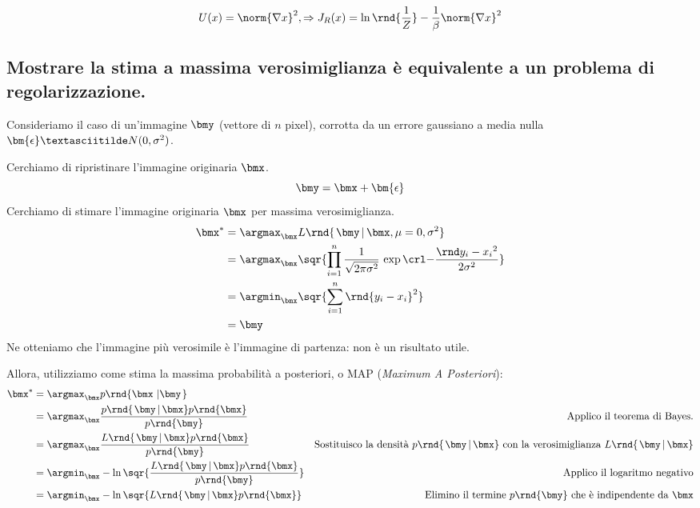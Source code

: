 \documentclass[\main/main.tex]{subfiles}
\begin{document}
\[
	U(x)=\norm{\nabla x}^2, \Rightarrow J_R(x) = \ln\rnd{\frac{1}{Z}}-\frac{1}{\beta}\norm{\nabla x}^2
\]

\subsection{Mostrare la stima a massima verosimiglianza è equivalente a un problema di regolarizzazione.}

Consideriamo il caso di un'immagine $\bmy$ (vettore di $n$ pixel), corrotta da un errore gaussiano a media nulla $\bm{\epsilon} \textasciitilde N(0,\sigma^2)$.

Cerchiamo di ripristinare l'immagine originaria $\bmx$.
\[
	\bmy=\bmx+\bm{\epsilon}
\]
Cerchiamo di stimare l'immagine originaria $\bmx$ per massima verosimiglianza.
\begin{align*}
	\bmx^* & = \argmax_{\bmx} L\rnd{\left.\bmy\,\right\rvert\bmx,\mu=0,\sigma^2} \\
	       & = \argmax_{\bmx} \sqr{ \prod_{i=1}^{n} \gauss{y_i}{x_i}{\sigma^2} } \\
	       & = \argmin_{\bmx} \sqr{ \sum_{i=1}^{n}\rnd{y_i-x_i}^2 }              \\
	       & = \bmy
\end{align*}
Ne otteniamo che l'immagine più verosimile è l'immagine di partenza: non è un risultato utile.

Allora, utilizziamo come stima la massima probabilità a posteriori, o MAP (\textit{Maximum A Posteriori}):
\begin{align*}
	\bmx^* & = \argmax_{\bmx} p\rnd{\bmx\,\left\rvert\bmy\right.}                                                                                                                                                                              \\
	       & = \argmax_{\bmx} \frac{p\rnd{\left.\bmy\,\right\rvert\bmx}p\rnd{\bmx}}{p\rnd{\bmy}}            & \text{Applico il teorema di Bayes.}                                                                                              \\
	       & = \argmax_{\bmx} \frac{L\rnd{\left.\bmy\,\right\rvert\bmx}p\rnd{\bmx}}{p\rnd{\bmy}}            & \text{Sostituisco la densità $p\rnd{\left.\bmy\,\right\rvert\bmx}$ con la verosimiglianza $L\rnd{\left.\bmy\,\right\rvert\bmx}$} \\
	       & = \argmin_{\bmx} -\ln\sqr{ \frac{L\rnd{\left.\bmy\,\right\rvert\bmx}p\rnd{\bmx}}{p\rnd{\bmy}}} & \text{Applico il logaritmo negativo}                                                                                             \\
	       & =\argmin_{\bmx} -\ln\sqr{L\rnd{\left.\bmy\,\right\rvert\bmx}p\rnd{\bmx}}                       & \text{Elimino il termine $p\rnd{\bmy}$ che è indipendente da $\bmx$}
\end{align*}
\end{document}
